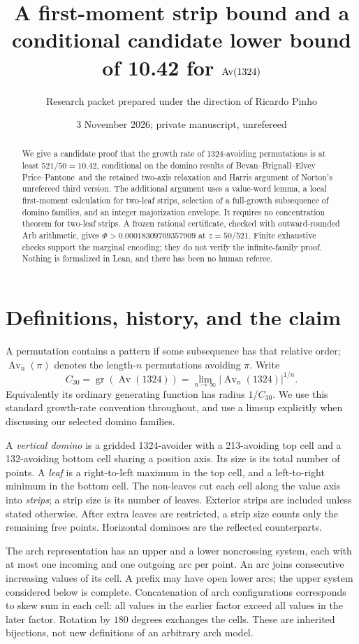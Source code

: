 \documentclass[11pt]{amsart}
\title[A conditional candidate lower bound of 10.42]{A first-moment strip bound and a conditional candidate lower bound of 10.42 for $\Av(1324)$}
\author{Research packet prepared under the direction of Ricardo Pinho}
\date{3 November 2026; private manuscript, unrefereed}
\numberwithin{equation}{section}
\theoremstyle{remark}\newtheorem{remark}[theorem]{Remark}
\newcommand{\Av}{\operatorname{Av}}
\newcommand{\bbep}{Bevan--Brignall--Elvey Price--Pantone}
\begin{document}
\begin{abstract}
We give a candidate proof that the growth rate of 1324-avoiding permutations is at least $521/50=10.42$, conditional on the domino results of \bbep\ and the retained two-axis relaxation and Harris argument of Norton's unrefereed third version. The additional argument uses a value-word lemma, a local first-moment calculation for two-leaf strips, selection of a full-growth subsequence of domino families, and an integer majorization envelope. It requires no concentration theorem for two-leaf strips. A frozen rational certificate, checked with outward-rounded Arb arithmetic, gives $\Phi>0.00018309709357909$ at $z=50/521$. Finite exhaustive checks support the marginal encoding; they do not verify the infinite-family proof. Nothing is formalized in Lean, and there has been no human referee.
\end{abstract}
\maketitle

\section{Definitions, history, and the claim}
A permutation contains a pattern if some subsequence has that relative order; $\Av_n(\pi)$ denotes the length-$n$ permutations avoiding $\pi$. Write
\[
 C_{30}=\operatorname{gr}(\Av(1324))
       =\lim_{n\to\infty}|\Av_n(1324)|^{1/n}.
\]
Equivalently its ordinary generating function has radius $1/C_{30}$. We use this standard growth-rate convention throughout, and use a limsup explicitly when discussing our selected domino families.

A \emph{vertical domino} is a gridded 1324-avoider with a 213-avoiding top cell and a 132-avoiding bottom cell sharing a position axis. Its size is its total number of points. A \emph{leaf} is a right-to-left maximum in the top cell, and a left-to-right minimum in the bottom cell. The non-leaves cut each cell along the value axis into \emph{strips}; a strip size is its number of leaves. Exterior strips are included unless stated otherwise. After extra leaves are restricted, a strip size counts only the remaining free points. Horizontal dominoes are the reflected counterparts.

The arch representation has an upper and a lower noncrossing system, each with at most one incoming and one outgoing arc per point. An arc joins consecutive increasing values of its cell. A prefix may have open lower arcs; the upper system considered below is complete. Concatenation of arch configurations corresponds to skew sum in each cell: all values in the earlier factor exceed all values in the later factor. Rotation by $180$ degrees exchanges the cells. These are inherited bijections, not new definitions of an arbitrary arch model.
\end{document}

